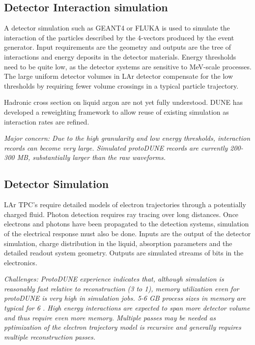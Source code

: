 \documentclass[../main-v1.tex]{subfiles}
\begin{document}
\subsection{Detector Interaction simulation}
A detector simulation such as GEANT4\cite{Allison:2016lfl} or FLUKA\cite{Bohlen:2014buj} is used to simulate the interaction of the particles described by the 4-vectors produced by the event generator. Input requirements are the geometry and outputs are the tree of interactions and energy deposits in the detector materials. 
Energy thresholds need to be quite low, as the detector systems are sensitive to MeV-scale processes. The large uniform detector volumes in LAr detector compensate for the low thresholds by requiring fewer volume crossings in a typical particle trajectory.  

Hadronic cross section on liquid argon are not yet fully understood.  DUNE has developed a reweighting framework 
\cite{Calcutt:2021zck} to allow reuse of existing simulation as interaction rates are refined.

{\it Major concern: Due to the high granularity and low energy thresholds, interaction records can become very large. Simulated protoDUNE records are currently 200-300 MB, substantially larger than the raw waveforms.}

\subsection{Detector Simulation}
LAr TPC's require detailed models of electron trajectories through a potentially charged fluid.  Photon detection requires ray tracing over long distances.  Once electrons and photons have been propagated to the detection systems, simulation of the electrical response must also be done. Inputs are the output of the detector simulation, charge distribution in the liquid, absorption parameters and the detailed readout system geometry. Outputs are simulated streams of bits in the electronics. 

{\it Challenges:  ProtoDUNE experience indicates that, although simulation is reasonably fast relative to reconstruction (3 to 1), memory utilization even for protoDUNE is very high in simulation jobs.  5-6 GB process sizes in memory are typical for 6 .  High energy  interactions are expected to span more detector volume and thus require even more memory. Multiple passes may be needed as pptimization of the electron trajectory model is recursive and generally requires multiple reconstruction passes. }
\end{document}

